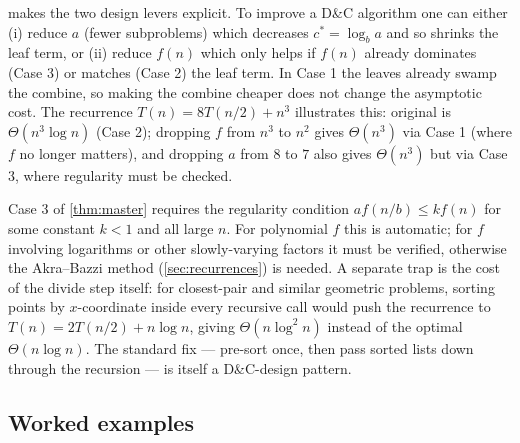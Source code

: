 \begin{remark}
 makes the two design levers explicit. To improve a D\&C algorithm one can either (i) reduce $a$ (fewer subproblems) which decreases $c^* = \log_b a$ and so shrinks the leaf term, or (ii) reduce $f(n)$ which only helps if $f(n)$ already dominates (Case 3) or matches (Case 2) the leaf term. In Case 1 the leaves already swamp the combine, so making the combine cheaper does not change the asymptotic cost. The recurrence $T(n) = 8T(n/2) + n^3$ illustrates this: original is $\Theta(n^3 \log n)$ (Case 2); dropping $f$ from $n^3$ to $n^2$ gives $\Theta(n^3)$ via Case 1 (where $f$ no longer matters), and dropping $a$ from $8$ to $7$ also gives $\Theta(n^3)$ but via Case 3, where regularity must be checked.
\end{remark}

\begin{remark}
Case 3 of \cref{thm:master} requires the regularity condition $a f(n/b) \le k f(n)$ for some constant $k < 1$ and all large $n$. For polynomial $f$ this is automatic; for $f$ involving logarithms or other slowly-varying factors it must be verified, otherwise the Akra--Bazzi method (\cref{sec:recurrences}) is needed. A separate trap is the cost of the divide step itself: for closest-pair and similar geometric problems, sorting points by $x$-coordinate inside every recursive call would push the recurrence to $T(n) = 2T(n/2) + n \log n$, giving $\Theta(n \log^2 n)$ instead of the optimal $\Theta(n \log n)$. The standard fix --- pre-sort once, then pass sorted lists down through the recursion --- is itself a D\&C-design pattern.
\end{remark}

\subsection{Worked examples}

